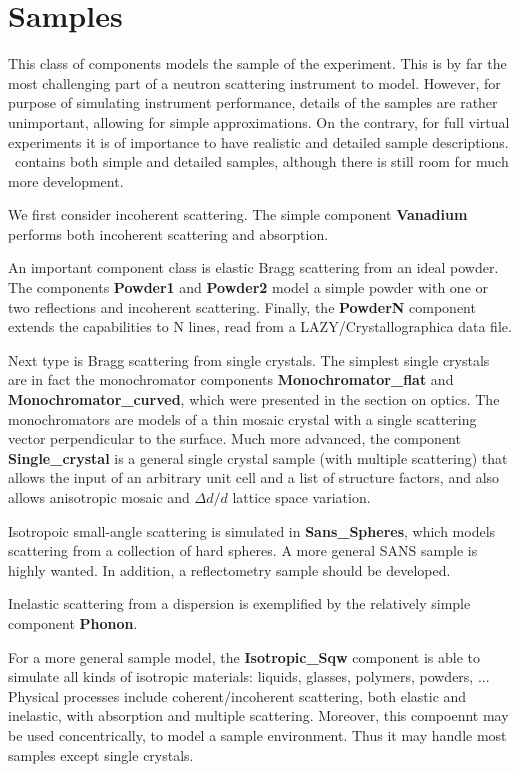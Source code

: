 
\chapter{Samples}

This class of components models the sample of the experiment.
This is by far the most challenging part of a neutron scattering
instrument to model. However, for purpose of simulating
instrument performance, details of the samples are rather unimportant,
allowing for simple approximations. On the contrary, for full
virtual experiments it is of importance to have realistic and
detailed sample descriptions. \MCS\ contains both simple and detailed
samples, although there is still room for much more development.

We first consider incoherent scattering. The simple component {\bf Vanadium}
performs both incoherent scattering and absorption.

An important component class is elastic Bragg scattering from an ideal powder.
The components {\bf Powder1} and {\bf Powder2} model a simple powder with one or two
reflections and incoherent scattering. Finally, the {\bf PowderN} component extends the capabilities to N lines, read from a LAZY/Crystallographica data file.

Next type is Bragg scattering from single crystals.
The simplest single crystals are in fact the monochromator components
{\bf Monochromator\_flat} and {\bf Monochromator\_curved},
which were presented in the section on optics.
The monochromators are models of a thin mosaic crystal
with a single scattering vector perpendicular to the surface.
Much more advanced, the component {\bf Single\_crystal}
is a general single crystal sample (with multiple scattering) that allows
the input of an arbitrary unit cell and a list of structure factors, and
also allows anisotropic mosaic and $\Delta d/d$ lattice space variation.

Isotropoic small-angle scattering is simulated in {\bf Sans\_Spheres},
which models scattering from a collection of hard spheres. A more general
SANS sample is highly wanted. In addition, a reflectometry sample
should be developed.

Inelastic scattering from a dispersion is exemplified by
the relatively simple component {\bf Phonon}.

For a more general sample model, the {\bf Isotropic\_Sqw} component is able to simulate all kinds of isotropic materials: liquids, glasses, polymers, powders, ... Physical processes include coherent/incoherent scattering, both elastic and inelastic, with absorption and multiple scattering. Moreover, this compoennt may be used concentrically, to model a sample environment. Thus it may handle most samples except single crystals.

